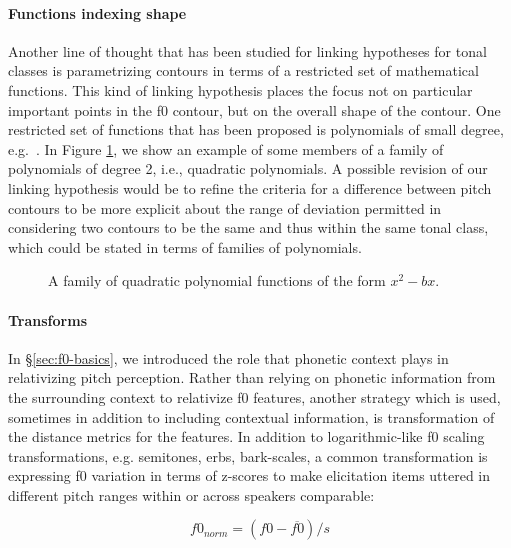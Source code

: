 \documentclass[12pt]{article}
\begin{document}
\paragraph{Functions indexing shape}

Another line of thought that has been studied for linking hypotheses
for tonal classes is parametrizing contours in terms of a restricted
set of mathematical functions. This kind of linking hypothesis places
the focus not on particular important points in the f0 contour, but on
the overall shape of the contour. One restricted set of functions that
has been proposed is polynomials of small degree, e.g.\
\citet{Andruski:2004, Kochanski:2005}. In Figure \ref{fig:poly}, we
show an example of some members of a family of polynomials of degree
2, i.e., quadratic polynomials. A possible revision of our linking
hypothesis would be to refine the criteria for a difference between pitch
contours to be more explicit about the range of deviation permitted in
considering two contours to be the same and thus within the same tonal
class, which could be stated in terms of families of polynomials.
   
\begin{figure}
  \centering
  
  \caption{A family of quadratic polynomial functions of the form
    $x^2-bx$.}
  \label{fig:poly}
\end{figure}


\paragraph{Transforms}

In \S\ref{sec:f0-basics}, we introduced the role that phonetic context
plays in relativizing pitch perception. Rather than relying on
phonetic information from the surrounding context to relativize f0
features, another strategy which is used, sometimes in addition to
including contextual information, is transformation of the distance
metrics for the features. In addition to logarithmic-like f0 scaling transformations,
e.g. semitones, erbs, bark-scales, a common transformation is
expressing f0 variation in terms of z-scores \citep{Rose:1987} to make
elicitation items uttered in different pitch ranges within or across
speakers comparable:

\begin{equation}
  \label{eq:z-score}
  f0_{norm} = (f0 - \overline{f0})/s
\end{equation}
\end{document}
